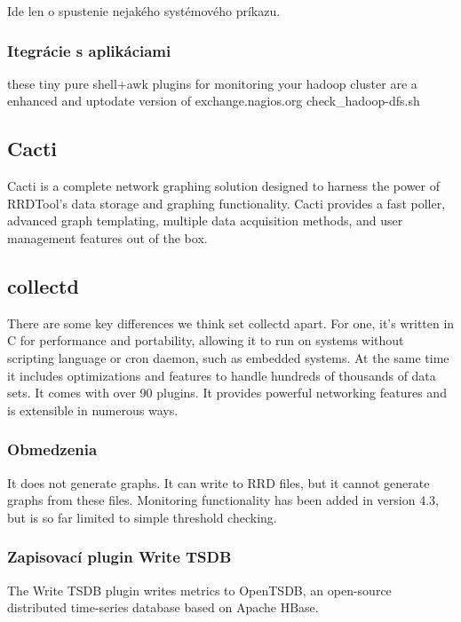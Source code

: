 \documentclass[11pt,final,oneside]{fithesis}
\begin{document}
Ide len o spustenie nejakého systémového príkazu.
\cite{09}

\subsubsection{Itegrácie s aplikáciami} 
these tiny pure shell+awk plugins for monitoring your hadoop cluster are a enhanced and uptodate version of exchange.nagios.org check\_hadoop-dfs.sh
\cite{10}

\subsection{Cacti}
Cacti is a complete network graphing solution designed to harness the power of RRDTool's data storage and graphing functionality. Cacti provides a fast poller, advanced graph templating, multiple data acquisition methods, and user management features out of the box.
\cite{11}

\subsection{collectd}
There are some key differences we think set collectd apart. For one, it's written in C for performance and portability, allowing it to run on systems without scripting language or cron daemon, such as embedded systems. 
At the same time it includes optimizations and features to handle hundreds of thousands of data sets. It comes with over 90 plugins. It provides powerful networking features and is extensible in numerous ways. 

\subsubsection{Obmedzenia}
It does not generate graphs. It can write to RRD files, but it cannot generate graphs from these files. 
Monitoring functionality has been added in version 4.3, but is so far limited to simple threshold checking. 
\cite{12}

\subsubsection{Zapisovací plugin Write TSDB}
The Write TSDB plugin writes metrics to OpenTSDB, an open-source distributed time-series database based on Apache HBase.
\cite{13}
\end{document}

